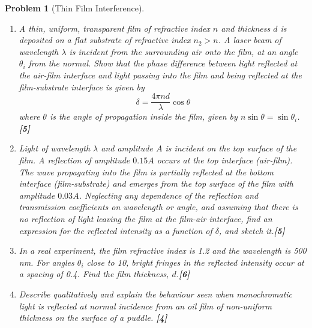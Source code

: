 \documentclass[a4paper]{article}
\theoremstyle{new}
\newtheorem{qns}{Problem}[subsection]
\begin{document}
\begin{qns}[Thin Film Interference]\leavevmode
\begin{enumerate}[label=(\roman*)]
\item A thin, uniform, transparent film of refractive index $n$ and thickness $d$ is deposited on a flat substrate of refractive index $n_2 > n$. A laser beam of wavelength $\lambda$ is incident from the surrounding air onto the film, at an angle $\theta_i$ from the normal. Show that the phase difference between light reflected at the air-film interface and light passing into the film and being reflected at the film-substrate interface is given by
$$\delta=\frac{4\pi nd}{\lambda}\cos\theta$$
where $\theta$ is the angle of propagation inside the film, given by $n\sin\theta=\sin\theta_i$.\hfill\textbf{[5]}
\item Light of wavelength $\lambda$ and amplitude $A$ is incident on the top surface of the film. A reflection of amplitude $0.15A$ occurs at the top interface (air-film). The wave propagating into the film is partially reflected at the bottom interface (film-substrate) and emerges from the top surface of the film with amplitude $0.03A$. Neglecting any dependence of the reflection and transmission coefficients on wavelength or angle, and assuming that there is no reflection of light leaving the film at the film-air interface, find an expression for the reflected intensity as a function of $\delta$, and sketch it.\hfill\textbf{[5]}
\item In a real experiment, the film refractive index is 1.2 and the wavelength is 500 nm. For angles $\theta_i$ close to 10\degree, bright fringes in the reflected intensity occur at a spacing of 0.4\degree. Find the film thickness, $d$.\hfill\textbf{[6]}
\item Describe qualitatively and explain the behaviour seen when monochromatic light is reflected at normal incidence from an oil film of non-uniform thickness on the surface of a puddle. \hfill\textbf{[4]}
\end{enumerate}
\end{qns}
\newpage
\end{document}
